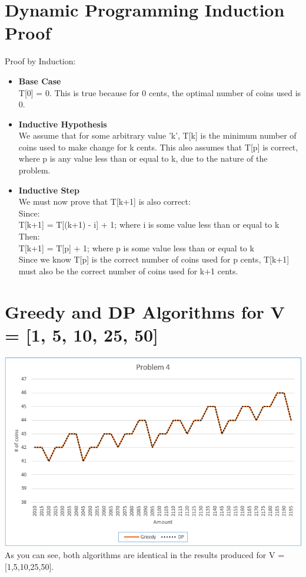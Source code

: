 \documentclass[11pt,letterpaper]{article}
\begin{document}
\section{Dynamic Programming Induction Proof}
	Proof by Induction:
\begin{itemize}
	\item \textbf{Base Case}\\
	T[0] = 0. This is true because for 0 cents, the optimal number of coins used is 0.
	\item \textbf{Inductive Hypothesis}\\
	We assume that for some arbitrary value 'k', T[k] is the minimum number of coins used to make change for k cents. This also assumes that T[p] is correct, where p is any value less than or equal to k, due to the nature of the problem.
	\item \textbf{Inductive Step}\\
	We must now prove that T[k+1] is also correct:\\
	\hspace{15pt}Since:\\ 
	\hspace{30pt}T[k+1] = T[(k+1) - i] + 1; where i is some value less than or equal to k\\
	\hspace{15pt}Then:\\
	\hspace{30pt}T[k+1] = T[p] + 1; where p is some value less than or equal to k\\
	Since we know T[p] is the correct number of coins used for p cents, T[k+1] must also be the correct number of coins used for k+1 cents.
\end{itemize}	 
\section{Greedy and DP Algorithms for V = [1, 5, 10, 25, 50]}
	\includegraphics[width=6in]{p4.png}\\
	As you can see, both algorithms are identical in the results produced for V = [1,5,10,25,50].\\
\end{document}
